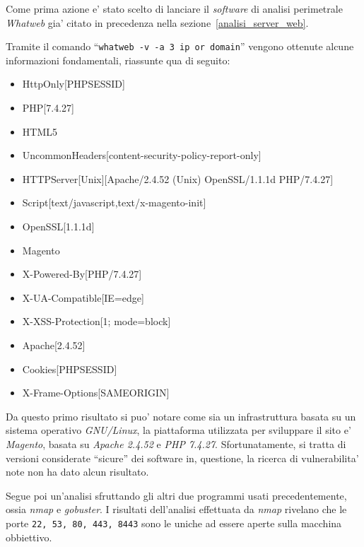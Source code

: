 \documentclass[a4paper]{report}
\newcommand{\quotes}[1]{``#1''}
\begin{document}
		Come prima azione e' stato scelto di lanciare il \emph{software} di analisi perimetrale \emph{Whatweb} gia'
		citato in precedenza nella sezione~\ref{analisi_server_web}.

		Tramite il comando \quotes{\texttt{whatweb -v -a 3 ip or domain}}
		vengono ottenute alcune informazioni fondamentali, riassunte qua di seguito:
		\begin{itemize}
			\item HttpOnly[PHPSESSID]
			\item PHP[7.4.27]
			\item HTML5
			\item UncommonHeaders[content-security-policy-report-only]
			\item HTTPServer[Unix][Apache/2.4.52 (Unix) OpenSSL/1.1.1d PHP/7.4.27]
			\item Script[text/javascript,text/x-magento-init]
			\item OpenSSL[1.1.1d]
			\item Magento
			\item X-Powered-By[PHP/7.4.27]
			\item X-UA-Compatible[IE=edge]
			\item X-XSS-Protection[1; mode=block]
			\item Apache[2.4.52]
			\item Cookies[PHPSESSID]
			\item X-Frame-Options[SAMEORIGIN]
		\end{itemize}
		Da questo primo risultato si puo' notare come sia un infrastruttura basata su un sistema operativo
		\emph{GNU/Linux}, la piattaforma utilizzata per sviluppare il sito e' \emph{Magento}, basata su \emph{Apache
		2.4.52} e \emph{PHP 7.4.27}. Sfortunatamente, si tratta di versioni considerate \quotes{sicure} dei software in,
		questione, la ricerca di vulnerabilita' note non ha dato alcun risultato.

		Segue poi un'analisi sfruttando gli altri due programmi usati precedentemente, ossia \emph{nmap} e
		\emph{gobuster}. I risultati dell'analisi effettuata da \emph{nmap} rivelano che le porte \texttt{22, 53, 80,
		443, 8443} sono le uniche ad essere aperte sulla macchina obbiettivo.
\end{document}
